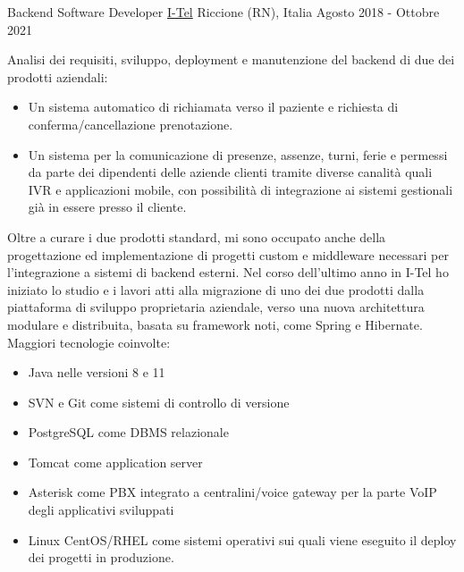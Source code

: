 \begin{cventries}
\cventry
    {Backend Software Developer} %
    {\href{https://i-tel.it}{I-Tel}} %
    {Riccione (RN), Italia} %
    {Agosto 2018 - Ottobre 2021} %
    {
      	Analisi dei requisiti, sviluppo, deployment e manutenzione del backend di due dei prodotti aziendali:
      	\begin{itemize}
      		\item {Un sistema automatico di richiamata verso il paziente e richiesta di conferma/cancellazione prenotazione.}
      		\item {Un sistema per la comunicazione di presenze, assenze, turni, ferie e permessi da parte dei dipendenti delle aziende clienti tramite diverse canalità quali IVR e applicazioni mobile, con possibilità di integrazione ai sistemi gestionali già in essere presso il cliente.}
      	\end{itemize}
      	Oltre a curare i due prodotti standard, mi sono occupato anche della progettazione ed implementazione di progetti custom e middleware necessari per l'integrazione a sistemi di backend esterni.
      	Nel corso dell'ultimo anno in I-Tel ho iniziato lo studio e i lavori atti alla migrazione di uno dei due prodotti dalla piattaforma di sviluppo proprietaria aziendale, verso una nuova architettura modulare e distribuita, basata su framework noti, come Spring e Hibernate.
      	Maggiori tecnologie coinvolte:
      	\begin{itemize}
      		\item {Java nelle versioni 8 e 11}
      		\item {SVN e Git come sistemi di controllo di versione}
      		\item {PostgreSQL come DBMS relazionale}
      		\item {Tomcat come application server}
      		\item {Asterisk come PBX integrato a centralini/voice gateway per la parte VoIP degli applicativi sviluppati}
      		\item {Linux CentOS/RHEL come sistemi operativi sui quali viene eseguito il deploy dei progetti in produzione.}
      	\end{itemize}
    }



\end{cventries}
